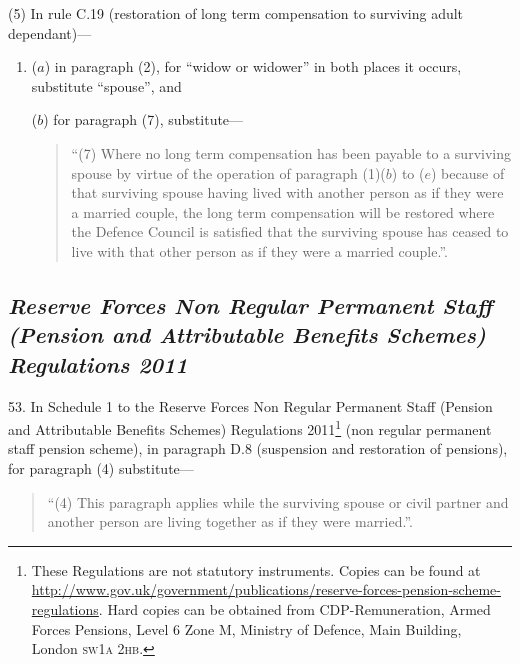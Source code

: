 \documentclass[12pt,a4paper]{article}
\begin{document}
(5) In rule C.19 (restoration of long term compensation to surviving adult dependant)—
\begin{enumerate}\item[]
($a$) in paragraph (2), for “widow or widower” in both places it occurs, substitute “spouse”, and

($b$) for paragraph (7), substitute—
\begin{quotation}
“(7) Where no long term compensation has been payable to a surviving spouse by virtue of the operation of paragraph (1)($b$)  to ($e$)  because of that surviving spouse having lived with another person as if they were a married couple, the long term compensation will be restored where the Defence Council is satisfied that the surviving spouse has ceased to live with that other person as if they were a married couple.”.
\end{quotation}
\end{enumerate}

\subsection*{\itshape Reserve Forces Non Regular Permanent Staff (Pension and Attributable Benefits Schemes) Regulations 2011}

53.  In Schedule 1 to the Reserve Forces Non Regular Permanent Staff (Pension and Attributable Benefits Schemes) Regulations 2011\footnote{These Regulations are not statutory instruments. Copies can be found at \href{http://www.gov.uk/government/publications/reserve-forces-pension-scheme-regulations}{http://\hspace{0pt}www.\hspace{0pt}gov.\hspace{0pt}uk/\hspace{0pt}government/\hspace{0pt}publications/\hspace{0pt}reserve-forces-pension-scheme-regulations}. Hard copies can be obtained from CDP-Remuneration, Armed Forces Pensions, Level 6 Zone M, Ministry of Defence, Main Building, London \textsc{\lowercase{SW1A 2HB}}.} (non regular permanent staff pension scheme), in paragraph D.8 (suspension and restoration of pensions), for paragraph (4) substitute—
\begin{quotation}
“(4) This paragraph applies while the surviving spouse or civil partner and another person are living together as if they were married.”.
\end{quotation}
\end{document}
